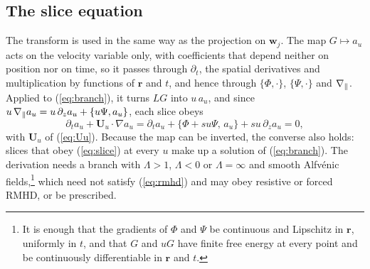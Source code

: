 \subsection{The slice equation}\label{sl:slicesec}

The transform is used in the same way as the projection on $\boldsymbol w_j$. The map $G\mapsto a_u$ acts on the velocity variable only, with coefficients that depend neither on position nor on time, so it passes through $\partial_t$, the spatial derivatives and multiplication by functions of $\boldsymbol r$ and $t$, and hence through $\{\Phi,\cdot\}$, $\{\Psi,\cdot\}$ and $\nabla_\parallel$. Applied to (\ref{eq:branch}), it turns $LG$ into $u\,a_u$, and since $u\,\nabla_\parallel a_u=u\,\partial_za_u+\{u\Psi,a_u\}$, each slice obeys
\begin{equation}\label{eq:slice}
  \partial_ta_u+\boldsymbol U_u\cdot\nabla a_u=\partial_ta_u+\{\Phi+su\Psi,\,a_u\}+su\,\partial_za_u=0,
\end{equation}
with $\boldsymbol U_u$ of (\ref{eq:Uu}). Because the map can be inverted, the converse also holds: slices that obey (\ref{eq:slice}) at every $u$ make up a solution of (\ref{eq:branch}). The derivation needs a branch with $\Lambda>1$, $\Lambda<0$ or $\Lambda=\infty$ and smooth Alfv\'enic fields,\footnote{It is enough that the gradients of $\Phi$ and $\Psi$ be continuous and Lipschitz in $\boldsymbol r$, uniformly in $t$, and that $G$ and $uG$ have finite free energy at every point and be continuously differentiable in $\boldsymbol r$ and $t$.} which need not satisfy (\ref{eq:rmhd}) and may obey resistive or forced RMHD, or be prescribed.

